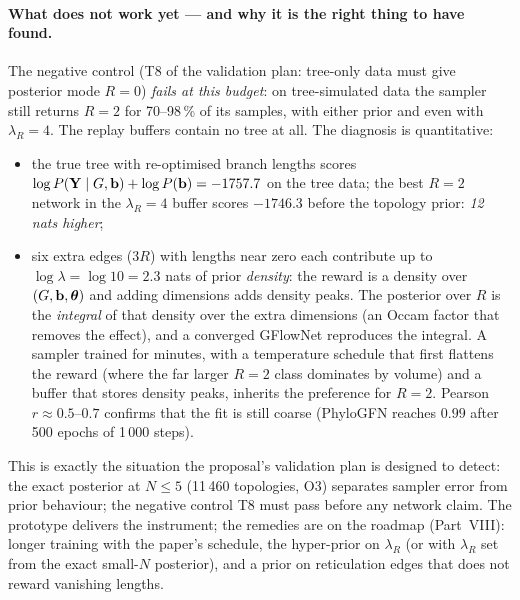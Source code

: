 \paragraph{What does not work yet --- and why it is the right thing to have found.} The negative control (T8 of the validation plan: tree-only data must give posterior mode $R=0$) \emph{fails at this budget}: on tree-simulated data the sampler still returns $R=2$ for 70--98\,\% of its samples, with either prior and even with $\lambda_R=4$. The replay buffers contain no tree at all. The diagnosis is quantitative:
\begin{itemize}[nosep]
\item the true tree with re-optimised branch lengths scores $\log P(\mathbf{Y}\mid G,\mathbf{b})+\log P(\mathbf{b})=-1757.7$ on the tree data; the best $R=2$ network in the $\lambda_R=4$ buffer scores $-1746.3$ before the topology prior: \emph{12 nats higher};
\item six extra edges ($3R$) with lengths near zero each contribute up to $\log\lambda=\log10=2.3$ nats of prior \emph{density}: the reward is a density over $(G,\mathbf{b},\bm{\theta})$ and adding dimensions adds density peaks. The posterior over $R$ is the \emph{integral} of that density over the extra dimensions (an Occam factor that removes the effect), and a converged GFlowNet reproduces the integral. A sampler trained for minutes, with a temperature schedule that first flattens the reward (where the far larger $R=2$ class dominates by volume) and a buffer that stores density peaks, inherits the preference for $R=2$. Pearson $r\approx0.5$--$0.7$ confirms that the fit is still coarse (PhyloGFN reaches $0.99$ after 500 epochs of 1\,000 steps).
\end{itemize}
This is exactly the situation the proposal's validation plan is designed to detect: the exact posterior at $N\le5$ (11\,460 topologies, O3) separates sampler error from prior behaviour; the negative control T8 must pass before any network claim. The prototype delivers the instrument; the remedies are on the roadmap (Part~VIII): longer training with the paper's schedule, the hyper-prior on $\lambda_R$ (or  with $\lambda_R$ set from the exact small-$N$ posterior), and a prior on reticulation edges that does not reward vanishing lengths.
\clearpage
